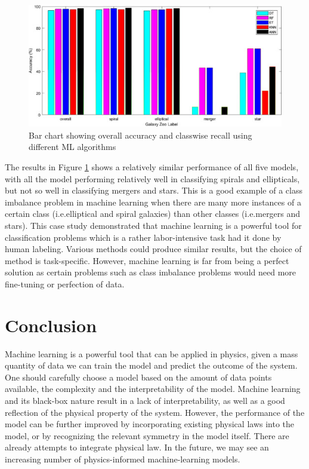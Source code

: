 \documentclass[aps,prb,twocolumn,superscriptaddress,floatfix]{revtex4-2}
\begin{document}
\begin{figure}[h]
    \includegraphics[clip=true,width=\columnwidth]{CS_Galaxy_Result.jpg}
    \caption{Bar chart showing overall accuracy and classwise recall using different ML algorithms}
    \label{fig: Result}
\end{figure}
The results in Figure \ref{fig: Result} shows a relatively similar performance of all five models, with all the model performing relatively well in classifying spirals and ellipticals, but not so well in classifying mergers and stars. This is a good example of a class imbalance problem in machine learning when there are many more instances of a certain class (i.e.elliptical and spiral galaxies) than other classes (i.e.mergers and stars).
This case study demonstrated that machine learning is a powerful tool for classification problems which is a rather labor-intensive task had it done by human labeling. Various methods could produce similar results, but the choice of method is task-specific. However, machine learning is far from being a perfect solution as certain problems such as class imbalance problems would need more fine-tuning or perfection of data.

\section{Conclusion}
Machine learning is a powerful tool that can be applied in physics, given a mass quantity of data we can train the model and predict the outcome of the system. One should carefully choose a model based on the amount of data points available, the complexity and the interpretability of the model. Machine learning and its black-box nature result in a lack of interpretability, as well as a good reflection of the physical property of the system. However, the performance of the model can be further improved by incorporating existing physical laws into the model, or by recognizing the relevant symmetry in the model itself. There are already attempts to integrate physical law. In the future, we may see an increasing number of physics-informed machine-learning models.

 

\end{document}
